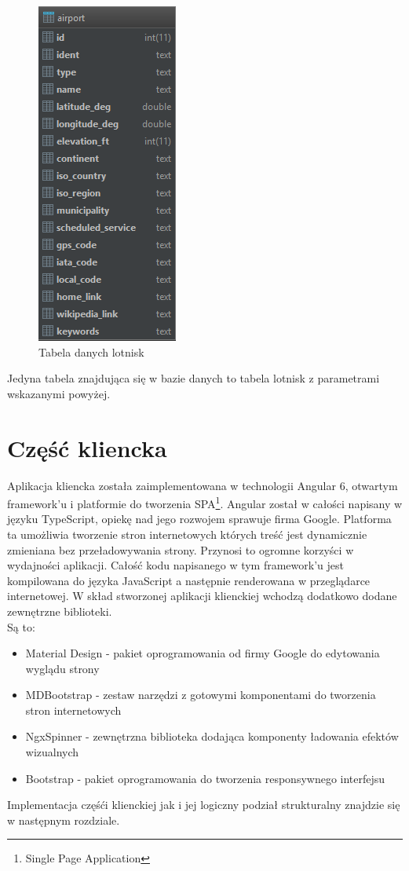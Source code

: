 \documentclass[12pt, twoside]{report}
\begin{document}
\begin{figure}[!ht]
\centering
\includegraphics[scale=0.80, keepaspectratio]{database.png}
\caption{Tabela danych lotnisk}
\label{fig:database}
\end{figure}
Jedyna tabela znajdująca się w bazie danych to tabela lotnisk z parametrami wskazanymi powyżej.

\section{Część kliencka}
Aplikacja kliencka została zaimplementowana w technologii Angular 6, otwartym framework'u i platformie do tworzenia SPA\footnote{Single Page Application}. Angular został w całości napisany w języku TypeScript, opiekę nad jego rozwojem sprawuje firma Google. Platforma ta umożliwia tworzenie stron internetowych których treść jest dynamicznie zmieniana bez przeładowywania strony. Przynosi to ogromne korzyści w wydajności aplikacji. Całość kodu napisanego w tym framework'u jest kompilowana do języka JavaScript a następnie renderowana w przeglądarce internetowej. W skład stworzonej aplikacji klienckiej wchodzą dodatkowo dodane zewnętrzne biblioteki.\\ Są to: 
\begin{itemize}[noitemsep,topsep=0pt]
\item Material Design - pakiet oprogramowania od firmy Google do edytowania wyglądu strony
\item MDBootstrap - zestaw narzędzi z gotowymi komponentami do tworzenia stron internetowych
\item NgxSpinner - zewnętrzna biblioteka dodająca komponenty ładowania efektów wizualnych
\item Bootstrap - pakiet oprogramowania do tworzenia responsywnego interfejsu
\end{itemize}
Implementacja częśći klienckiej jak i jej logiczny podział strukturalny znajdzie się w następnym rozdziale.
\end{document}

